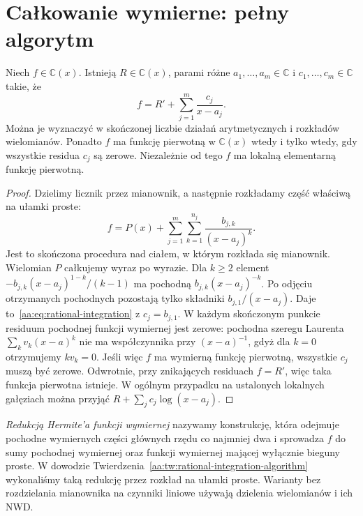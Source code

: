\section{Całkowanie wymierne: pełny algorytm}

\begin{twierdzenie}
\label{aa:tw:rational-integration-algorithm}
Niech $f\in\mathbb C(x)$. Istnieją
$R\in\mathbb C(x)$, parami różne
$a_1,\ldots,a_m\in\mathbb C$
i $c_1,\ldots,c_m\in\mathbb C$ takie, że
\begin{equation}\label{aa:eq:rational-integration}
 f=R'+\sum_{j=1}^{m}\frac{c_j}{x-a_j}.
\end{equation}
Można je wyznaczyć w skończonej liczbie
działań arytmetycznych i rozkładów wielomianów.
Ponadto $f$ ma funkcję pierwotną
w $\mathbb C(x)$ wtedy i tylko wtedy,
gdy wszystkie residua $c_j$ są zerowe.
Niezależnie od tego $f$ ma lokalną
elementarną funkcję pierwotną.
\end{twierdzenie}
\begin{proof}
Dzielimy licznik przez mianownik,
a następnie rozkładamy część właściwą
na ułamki proste:
\[
 f=P(x)+
 \sum_{j=1}^{m}\sum_{k=1}^{n_j}
         \frac{b_{j,k}}{(x-a_j)^k}.
\]
Jest to skończona procedura nad
ciałem, w którym rozkłada się mianownik.
Wielomian $P$ całkujemy wyraz po wyrazie.
Dla $k\ge2$ element
$-b_{j,k}(x-a_j)^{1-k}/(k-1)$
ma pochodną
$b_{j,k}(x-a_j)^{-k}$.
Po odjęciu otrzymanych pochodnych
pozostają tylko składniki
$b_{j,1}/(x-a_j)$.
Daje to~\eqref{aa:eq:rational-integration}
z $c_j=b_{j,1}$.
W każdym skończonym punkcie
residuum pochodnej funkcji wymiernej
jest zerowe: pochodna szeregu
Laurenta $\sum_k v_k(x-a)^k$
nie ma współczynnika przy
$(x-a)^{-1}$, gdyż dla $k=0$
otrzymujemy $k v_k=0$.
Jeśli więc $f$ ma wymierną funkcję
pierwotną, wszystkie $c_j$ muszą być
zerowe. Odwrotnie, przy znikających
residuach $f=R'$, więc taka
funkcja pierwotna istnieje.
W ogólnym przypadku na ustalonych
lokalnych gałęziach można przyjąć
$R+\sum_jc_j\log(x-a_j)$.
\end{proof}

\begin{definicja}
\label{aa:def:hermite-rational}
\emph{Redukcją Hermite'a funkcji wymiernej}
nazywamy konstrukcję, która odejmuje
pochodne wymiernych części głównych
rzędu co najmniej dwa i sprowadza
$f$ do sumy pochodnej wymiernej
oraz funkcji wymiernej mającej
wyłącznie bieguny proste.
W dowodzie
Twierdzenia~\ref{aa:tw:rational-integration-algorithm}
wykonaliśmy taką redukcję
przez rozkład na ułamki proste.
Warianty bez rozdzielania mianownika
na czynniki liniowe używają
dzielenia wielomianów i ich NWD.
\end{definicja}

